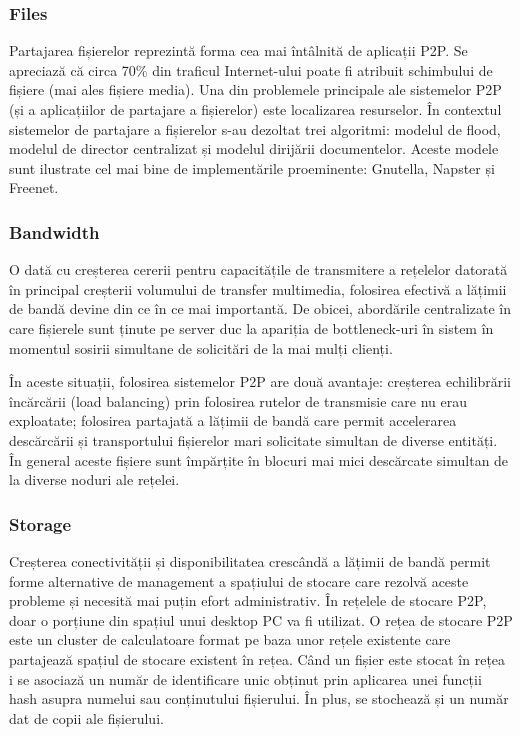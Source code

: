 \subsubsection{Files}

Partajarea fișierelor reprezintă forma cea mai întâlnită de aplicații P2P. Se
apreciază că circa 70\% din traficul Internet-ului poate fi atribuit schimbului
de fișiere (mai ales fișiere media). Una din problemele principale ale
sistemelor P2P (și a aplicațiilor de partajare a fișierelor) este localizarea
resurselor. În contextul sistemelor de partajare a fișierelor s-au dezoltat
trei algoritmi: modelul de flood, modelul de director centralizat și modelul
dirijării documentelor. Aceste modele sunt ilustrate cel mai bine de
implementările proeminente: Gnutella, Napster și Freenet.

\subsubsection{Bandwidth}

O dată cu creșterea cererii pentru capacitățile de transmitere a rețelelor
datorată în principal creșterii volumului de transfer multimedia, folosirea
efectivă a lățimii de bandă devine din ce în ce mai importantă. De obicei,
abordările centralizate în care fișierele sunt ținute pe server duc la
apariția de bottleneck-uri în sistem în momentul sosirii simultane de
solicitări de la mai mulți clienți.

În aceste situații, folosirea sistemelor P2P are două avantaje: creșterea
echilibrării încărcării (load balancing) prin folosirea rutelor de transmisie
care nu erau exploatate; folosirea partajată a lățimii de bandă care permit
accelerarea descărcării și transportului fișierelor mari solicitate simultan
de diverse entități. În general aceste fișiere sunt împărțite în blocuri mai
mici descărcate simultan de la diverse noduri ale rețelei.

\subsubsection{Storage}

Creșterea conectivității și disponibilitatea crescândă a lățimii de bandă
permit forme alternative de management a spațiului de stocare care rezolvă
aceste probleme și necesită mai puțin efort administrativ. În rețelele de
stocare P2P, doar o porțiune din spațiul unui desktop PC va fi utilizat. O
rețea de stocare P2P este un cluster de calculatoare format pe baza unor
rețele existente care partajează spațiul de stocare existent în rețea. Când un
fișier este stocat în rețea i se asociază un număr de identificare unic
obținut prin aplicarea unei funcții hash asupra numelui sau conținutului
fișierului. În plus, se stochează și un număr dat de copii ale fișierului.


